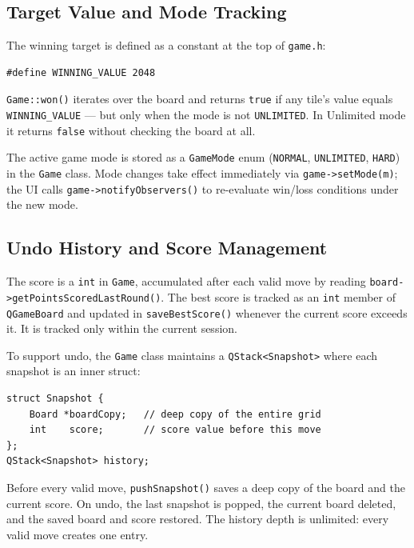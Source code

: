 \documentclass[a4paper,12pt]{article}
\begin{document}
\subsection{Target Value and Mode Tracking}

The winning target is defined as a constant at the top of \texttt{game.h}:

\begin{lstlisting}[style=CppStyle]
#define WINNING_VALUE 2048
\end{lstlisting}

\texttt{Game::won()} iterates over the board and returns \texttt{true} if any tile's value equals \texttt{WINNING\_VALUE} --- but only when the mode is not \texttt{UNLIMITED}. In Unlimited mode it returns \texttt{false} without checking the board at all.

The active game mode is stored as a \texttt{GameMode} enum (\texttt{NORMAL}, \texttt{UNLIMITED}, \texttt{HARD}) in the \texttt{Game} class. Mode changes take effect immediately via \texttt{game->setMode(m)}; the UI calls \texttt{game->notifyObservers()} to re-evaluate win/loss conditions under the new mode.

\subsection{Undo History and Score Management}

The score is a \texttt{int} in \texttt{Game}, accumulated after each valid move by reading \texttt{board->getPointsScoredLastRound()}. The best score is tracked as an \texttt{int} member of \texttt{QGameBoard} and updated in \texttt{saveBestScore()} whenever the current score exceeds it. It is tracked only within the current session.

To support undo, the \texttt{Game} class maintains a \texttt{QStack<Snapshot>} where each snapshot is an inner struct:

\begin{lstlisting}[style=CppStyle, caption={Snapshot struct inside \texttt{Game}}]
struct Snapshot {
    Board *boardCopy;   // deep copy of the entire grid
    int    score;       // score value before this move
};
QStack<Snapshot> history;
\end{lstlisting}

Before every valid move, \texttt{pushSnapshot()} saves a deep copy of the board and the current score. On undo, the last snapshot is popped, the current board deleted, and the saved board and score restored. The history depth is unlimited: every valid move creates one entry.
\end{document}
